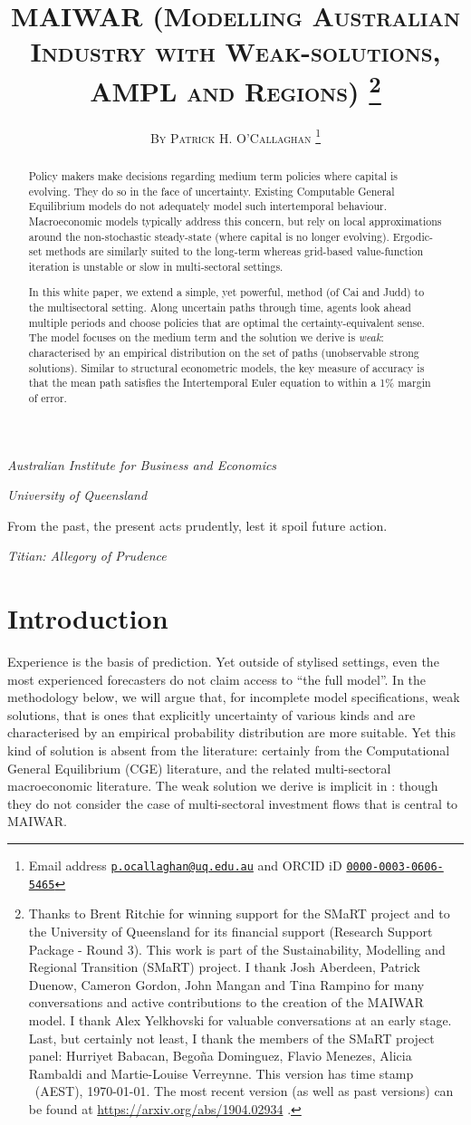 \documentclass[12pt,a4paper,twoside, draft]{article}
\title{
   \textsc{
MAIWAR (Modelling Australian Industry with Weak-solutions, AMPL and Regions)
}
\footnote{
      Thanks to Brent Ritchie for winning support for the SMaRT
      project and to the University of Queensland for its financial support
      (Research Support Package - Round 3).
      This work is part of the Sustainability, Modelling and Regional
      Transition (SMaRT) project.
      I thank Josh Aberdeen, Patrick Duenow, Cameron Gordon, John Mangan and
      Tina Rampino for many conversations and active contributions to the
      creation of the MAIWAR model.
      I thank Alex Yelkhovski for valuable conversations at an early stage. 
      Last, but certainly not least, I thank the members of the SMaRT project
      panel: Hurriyet Babacan, Bego\~{n}a Dominguez, Flavio Menezes, Alicia
      Rambaldi and Martie-Louise Verreynne.
      This version has time stamp \currenttime~(AEST), \today. The most recent
      version (as well as past versions) can be found at
      \url{https://arxiv.org/abs/1904.02934} .}}
\author{\large\textsc{By Patrick H. O'Callaghan}
   \footnote{Email address
    \href{mailto:p.ocallaghan@uq.edu.au}{\texttt{p.ocallaghan@uq.edu.au}} and
    ORCID iD \href{http://orcid.org/0000-0003-0606-5465}{
      \texttt{0000-0003-0606-5465}} }}
\date{}
\makeatletter
\renewcommand\maketitle
  {\begin{center}\mdseries\large
    {\@title}%
    \par\medskip\medskip
    {\normalsize\@author}%
    \par\medskip\medskip\normalfont
    \begin{small}
\emph{Australian Institute for Business and Economics}
\end{small}
\par
\begin{small}
\emph{University of Queensland}
\end{small}
   \end{center}
  }
\makeatother
\begin{document}
  \maketitle

  \pagestyle{fancy}
\renewcommand{\abstractname}{\vspace{-\baselineskip}} \thispagestyle{plain}
%

\begin{abstract}%
  
  Policy makers make decisions regarding medium term policies where capital is
  evolving.
  They do so in the face of uncertainty.
  Existing Computable General Equilibrium models do not adequately model
  such intertemporal behaviour.
  Macroeconomic models typically address this concern, but
  rely on local approximations around the non-stochastic steady-state
  (where capital is no longer evolving). Ergodic-set methods are similarly
  suited to the long-term whereas grid-based value-function iteration is
  unstable or slow in multi-sectoral settings.
  
  In this white paper, we extend a simple, yet powerful, method (of Cai and
  Judd) to the multisectoral setting. Along uncertain paths through time,
  agents look ahead multiple periods and choose policies that are optimal the
  certainty-equivalent sense. 
  The model focuses on the medium term and the solution we derive is
  \emph{weak}: characterised by an empirical distribution on the set of
  paths (unobservable strong solutions).
  Similar to structural econometric models, the key measure of accuracy is that
  the mean path satisfies the Intertemporal Euler equation to within a 1\%
  margin of error.
\end{abstract}
\setlength{\epigraphwidth}{11.5cm}
\epigraph{
   From the past, the present acts prudently, lest it spoil future action.
  }{\emph{Titian:  Allegory of Prudence}
}

\section{Introduction}\label{sec-introduction}
Experience is the basis of prediction.  Yet outside of stylised settings, even
the most experienced forecasters do not claim  access to ``the full
model''.
In the methodology below, we will argue that, for incomplete model
specifications, weak solutions, that is ones that explicitly uncertainty of
various kinds and are characterised by an empirical probability distribution
are more suitable.
Yet this kind of solution is absent from the literature: certainly from
the Computational General Equilibrium (CGE) literature, and the related
multi-sectoral macroeconomic literature.
The weak solution we derive is implicit in \citet{CJ}: though they do not
consider the case of multi-sectoral investment flows that is central to MAIWAR.
\end{document}
